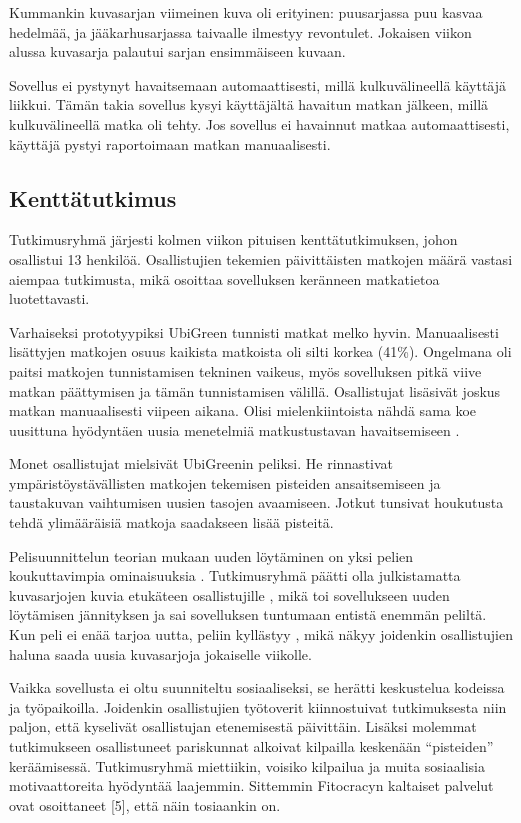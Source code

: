 \documentclass[finnish]{tktltiki2}
\theoremstyle{definition}
\theoremstyle{remark}
\begin{document}
Kummankin kuvasarjan viimeinen kuva oli erityinen: puusarjassa puu kasvaa hedelmää, ja jääkarhusarjassa taivaalle ilmestyy revontulet. Jokaisen viikon alussa kuvasarja palautui sarjan ensimmäiseen kuvaan.

Sovellus ei pystynyt havaitsemaan automaattisesti, millä kulkuvälineellä käyttäjä liikkui. Tämän takia sovellus kysyi käyttäjältä havaitun matkan jälkeen, millä kulkuvälineellä matka oli tehty. Jos sovellus ei havainnut matkaa automaattisesti, käyttäjä pystyi raportoimaan matkan manuaalisesti.

\subsection{Kenttätutkimus}

Tutkimusryhmä järjesti kolmen viikon pituisen kenttätutkimuksen, johon osallistui 13 henkilöä. Osallistujien tekemien päivittäisten matkojen määrä vastasi aiempaa tutkimusta, mikä osoittaa sovelluksen keränneen matkatietoa luotettavasti.

Varhaiseksi prototyypiksi UbiGreen tunnisti matkat melko hyvin. Manuaalisesti lisättyjen matkojen osuus kaikista matkoista oli silti korkea (41\%).
Ongelmana oli paitsi matkojen tunnistamisen tekninen vaikeus, myös sovelluksen pitkä viive matkan päättymisen ja tämän tunnistamisen välillä.
Osallistujat lisäsivät joskus matkan manuaalisesti viipeen aikana.
Olisi mielenkiintoista nähdä sama koe uusittuna hyödyntäen uusia menetelmiä matkustustavan havaitsemiseen \cite{hemminki}.

Monet osallistujat mielsivät UbiGreenin peliksi. He rinnastivat ympäristöystävällisten matkojen tekemisen pisteiden ansaitsemiseen ja taustakuvan vaihtumisen uusien tasojen avaamiseen. Jotkut tunsivat houkutusta tehdä ylimääräisiä matkoja saadakseen lisää pisteitä. 

Pelisuunnittelun teorian mukaan uuden löytäminen on yksi pelien koukuttavimpia ominaisuuksia \cite[s.~90]{theoryoffun}\cite[s.~109]{gamedesign}.
Tutkimusryhmä päätti olla julkistamatta kuvasarjojen kuvia etukäteen osallistujille \cite{ubigreen}, mikä toi sovellukseen uuden löytämisen jännityksen ja sai sovelluksen tuntumaan entistä enemmän peliltä.
Kun peli ei enää tarjoa uutta, peliin kyllästyy \cite[s.~42]{theoryoffun}, mikä näkyy joidenkin osallistujien haluna saada uusia kuvasarjoja jokaiselle viikolle.

Vaikka sovellusta ei oltu suunniteltu sosiaaliseksi, se herätti keskustelua kodeissa ja työpaikoilla. Joidenkin osallistujien työtoverit kiinnostuivat tutkimuksesta niin paljon, että kyselivät osallistujan etenemisestä päivittäin. Lisäksi molemmat tutkimukseen osallistuneet pariskunnat alkoivat kilpailla keskenään “pisteiden” keräämisessä. Tutkimusryhmä miettiikin, voisiko kilpailua ja muita sosiaalisia motivaattoreita hyödyntää laajemmin. Sittemmin Fitocracyn kaltaiset palvelut ovat osoittaneet [5], että näin tosiaankin on.
\end{document}
